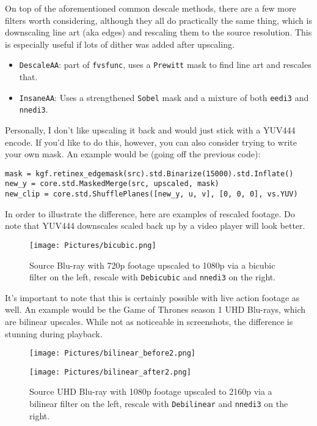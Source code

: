 \documentclass{scrartcl}
\begin{document}
On top of the aforementioned common descale methods, there are a few more filters worth considering, although they all do practically the same thing, which is downscaling line art (aka edges) and rescaling them to the source resolution.  This is especially useful if lots of dither was added after upscaling.
\begin{itemize}
	\item \texttt{DescaleAA}: part of \texttt{fvsfunc}, uses a \texttt{Prewitt} mask to find line art and rescales that.
	\item \texttt{InsaneAA}: Uses a strengthened \texttt{Sobel} mask and a mixture of both \texttt{eedi3} and \texttt{nnedi3}. 
\end{itemize}
Personally, I don't like upscaling it back and would just stick with a YUV444 encode.  If you'd like to do this, however, you can also consider trying to write your own mask.  An example would be (going off the previous code):
\begin{lstlisting}
mask = kgf.retinex_edgemask(src).std.Binarize(15000).std.Inflate()
new_y = core.std.MaskedMerge(src, upscaled, mask)
new_clip = core.std.ShufflePlanes([new_y, u, v], [0, 0, 0], vs.YUV)
\end{lstlisting}
\pagebreak

In order to illustrate the difference, here are examples of rescaled footage.  Do note that YUV444 downscales scaled back up by a video player will look better.
\begin{figure}[h]
\centering
\texttt{[image: Pictures/bicubic.png]}
\caption{Source Blu-ray with 720p footage upscaled to 1080p via a bicubic filter on the left, rescale with \texttt{Debicubic} and \texttt{nnedi3} on the right.}\label{fig:6}
\end{figure}

It's important to note that this is certainly possible with live action footage as well.  An example would be the Game of Thrones season 1 UHD Blu-rays, which are bilinear upscales.  While not as noticeable in screenshots, the difference is stunning during playback.  
\begin{figure}[h]
\begin{minipage}{.5\textwidth}
\centering
\texttt{[image: Pictures/bilinear\_before2.png]}
\end{minipage}
\begin{minipage}{.5\textwidth}
\centering
\texttt{[image: Pictures/bilinear\_after2.png]}
\end{minipage}
\caption{Source UHD Blu-ray with 1080p footage upscaled to 2160p via a bilinear filter on the left, rescale with \texttt{Debilinear} and \texttt{nnedi3} on the right.}\label{fig:7}
\end{figure}
\end{document}

